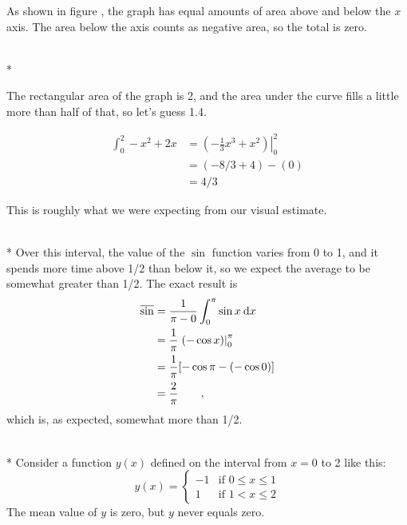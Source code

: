 As shown in  figure , the graph has equal amounts of area above and below the $x$ axis.
The area below the axis counts as negative area, so the total is zero.

\\*

The rectangular area of the graph is 2, and the area under the curve fills a little more than half of that, so let's guess 1.4.

\begin{align*}
  \int_0^2 -x^2+2x &= \left.\left(-\frac{1}{3}x^3+x^2\right)\right|_0^2 \\
             &= (-8/3+4)-(0) \\
             &= 4/3
\end{align*}

This is roughly what we were expecting from our visual estimate.

\\*
Over this interval, the value of the $\sin$ function varies from 0 to 1, and
it spends more time above 1/2 than below it, so we expect the average to be
somewhat greater than 1/2.
The exact result is
\begin{align*}
  \overline{\sin} &= \frac{1}{\pi-0}\int_0^\pi \sin x\:\textup{d} x \\
             &= \frac{1}{\pi}\left.(- \cos x)\right|_0^\pi \\
             &= \frac{1}{\pi}[-\cos\pi-(-\cos 0)] \\
             &= \frac{2}{\pi} \qquad ,
\end{align*}
which is, as expected, somewhat more than 1/2.

\\*
Consider a function $y(x)$ defined on the interval from $x=0$ to 2 like this:
\begin{equation*}
  y(x) = 
    \begin{cases}
      -1  & \text{if $0\le x \le 1$}\\
      1  & \text{if $1< x \le 2$}
    \end{cases}
\end{equation*}
The mean value of $y$ is zero, but $y$ never equals zero.

